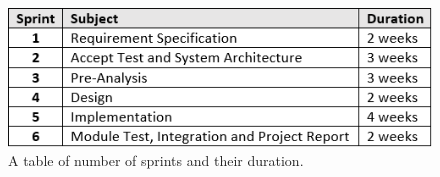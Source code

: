 \begin{figure}[H]
\centering
\includegraphics[scale=0.9]{./pictures/timetable.png}
\caption{A table of number of sprints and their duration.}
\label{fig:timetable.png}
\end{figure}






